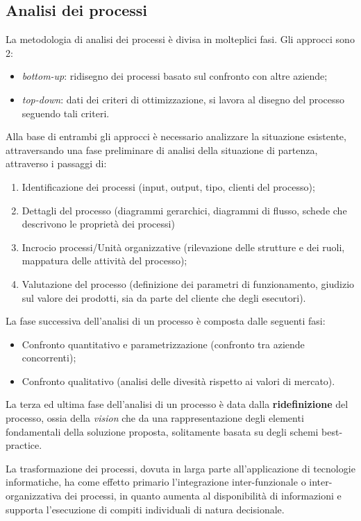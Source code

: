 \documentclass[a4paper, 10pt]{article}
\begin{document}
	\subsection{Analisi dei processi}
	La metodologia di analisi dei processi è divisa in molteplici fasi. Gli approcci sono 2:
	\begin{itemize}
		\item \textit{bottom-up}: ridisegno dei processi basato sul confronto con altre aziende;
		\item \textit{top-down}: dati dei criteri di ottimizzazione, si lavora al disegno del processo seguendo tali criteri.
	\end{itemize}

	Alla base di entrambi gli approcci è necessario analizzare la situazione esistente, attraversando una fase preliminare di analisi della situazione di partenza, attraverso i passaggi di:
	\begin{enumerate}
		\item Identificazione dei processi (input, output, tipo, clienti del processo);
		\item Dettagli del processo (diagrammi gerarchici, diagrammi di flusso, schede che descrivono le proprietà dei processi)
		\item Incrocio processi/Unità organizzative (rilevazione delle strutture e dei ruoli, mappatura delle attività del processo);
		\item Valutazione del processo (definizione dei parametri di funzionamento, giudizio sul valore dei prodotti, sia da parte del cliente che degli esecutori).
	\end{enumerate}

	La fase successiva dell'analisi di un processo è composta dalle seguenti fasi: \begin{itemize}
		\item Confronto quantitativo e parametrizzazione (confronto tra aziende concorrenti);
		\item Confronto qualitativo (analisi delle divesità rispetto ai valori di mercato).
	\end{itemize}

	La terza ed ultima fase dell'analisi di un processo è data dalla \textbf{ridefinizione} del processo, ossia della \textit{vision} che da una rappresentazione degli elementi fondamentali della soluzione proposta, solitamente basata su degli schemi best-practice.
	
	La trasformazione dei processi, dovuta in larga parte all'applicazione di tecnologie informatiche, ha come effetto primario l’integrazione inter-funzionale o inter-organizzativa dei processi, in quanto aumenta al disponibilità di informazioni e supporta l'esecuzione di compiti individuali di natura decisionale.
	
\end{document}
